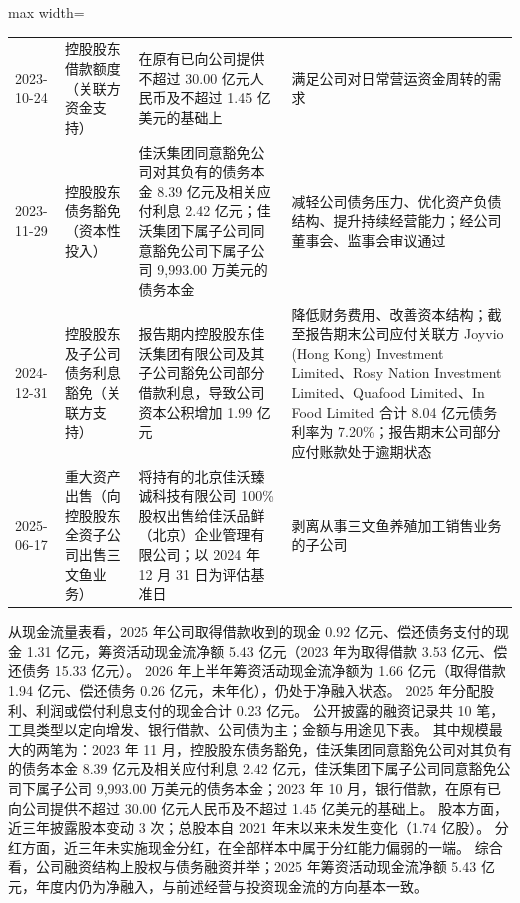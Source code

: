 \begin{center}
\begin{adjustbox}{max width=\textwidth}
\begin{tabular}{@{}p{1.45cm}p{2.55cm}p{4.05cm}p{4.95cm}@{}}
2023-10-24 & 控股股东借款额度（关联方资金支持） & 在原有已向公司提供不超过 30.00 亿元人民币及不超过 1.45 亿美元的基础上 & 满足公司对日常营运资金周转的需求 \\
2023-11-29 & 控股股东债务豁免（资本性投入） & 佳沃集团同意豁免公司对其负有的债务本金 8.39 亿元及相关应付利息 2.42 亿元；佳沃集团下属子公司同意豁免公司下属子公司 9,\allowbreak{}993.00 万美元的债务本金 & 减轻公司债务压力、\allowbreak{}优化资产负债结构、\allowbreak{}提升持续经营能力；经公司董事会、\allowbreak{}监事会审议通过 \\
2024-12-31 & 控股股东及子公司债务利息豁免（关联方支持） & 报告期内控股股东佳沃集团有限公司及其子公司豁免公司部分借款利息，\allowbreak{}导致公司资本公积增加 1.99 亿元 & 降低财务费用、\allowbreak{}改善资本结构；截至报告期末公司应付关联方 Joyvio (Hong Kong) Investment Limited、\allowbreak{}Rosy Nation Investment Limited、\allowbreak{}Quafood Limited、\allowbreak{}In Food Limited 合计 8.04 亿元债务利率为 7.20\%；报告期末公司部分应付账款处于逾期状态 \\
2025-06-17 & 重大资产出售（向控股股东全资子公司出售三文鱼业务） & 将持有的北京佳沃臻诚科技有限公司 100\% 股权出售给佳沃品鲜（北京）企业管理有限公司；以 2024 年 12 月 31 日为评估基准日 & 剥离从事三文鱼养殖加工销售业务的子公司 \\
\bottomrule
\end{tabular}
\end{adjustbox}
\end{center}

 从现金流量表看，2025 年公司取得借款收到的现金 0.92 亿元、偿还债务支付的现金 1.31 亿元，筹资活动现金流净额 5.43 亿元（2023 年为取得借款 3.53 亿元、偿还债务 15.33 亿元）。 2026 年上半年筹资活动现金流净额为 1.66 亿元（取得借款 1.94 亿元、偿还债务 0.26 亿元，未年化），仍处于净融入状态。 2025 年分配股利、利润或偿付利息支付的现金合计 0.23 亿元。 公开披露的融资记录共 10 笔，工具类型以定向增发、银行借款、公司债为主；金额与用途见下表。 其中规模最大的两笔为：2023 年 11 月，控股股东债务豁免，佳沃集团同意豁免公司对其负有的债务本金 8.39 亿元及相关应付利息 2.42 亿元，佳沃集团下属子公司同意豁免公司下属子公司 9,993.00 万美元的债务本金；2023 年 10 月，银行借款，在原有已向公司提供不超过 30.00 亿元人民币及不超过 1.45 亿美元的基础上。 股本方面，近三年披露股本变动 3 次；总股本自 2021 年末以来未发生变化（1.74 亿股）。 分红方面，近三年未实施现金分红，在全部样本中属于分红能力偏弱的一端。 综合看，公司融资结构上股权与债务融资并举；2025 年筹资活动现金流净额 5.43 亿元，年度内仍为净融入，与前述经营与投资现金流的方向基本一致。

